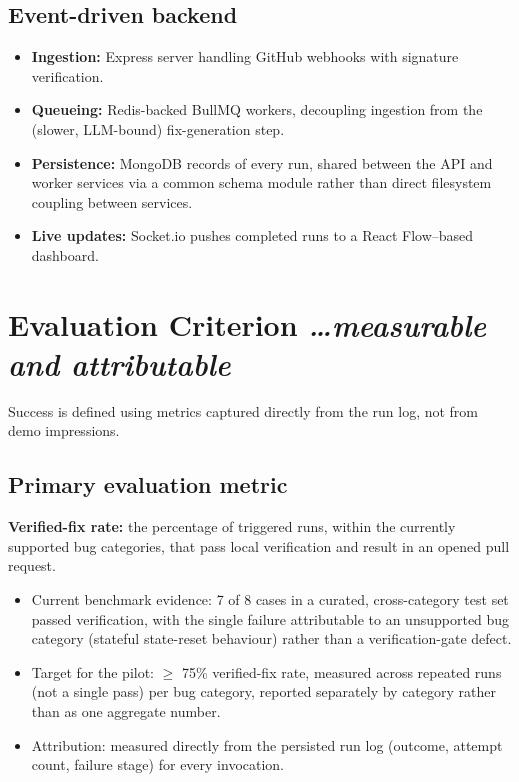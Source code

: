 \documentclass[11pt,a4paper]{article}
\newcommand{\BvrHint}[1]{%
  {\normalfont\normalsize\itshape\hfill #1}}
\begin{document}
\subsection{Event-driven backend}
\begin{itemize}[leftmargin=0.7cm]
    \item \textbf{Ingestion:} Express server handling GitHub
      webhooks with signature verification.
    \item \textbf{Queueing:} Redis-backed BullMQ workers, decoupling
      ingestion from the (slower, LLM-bound) fix-generation step.
    \item \textbf{Persistence:} MongoDB records of every run,
      shared between the API and worker services via a common
      schema module rather than direct filesystem coupling between
      services.
    \item \textbf{Live updates:} Socket.io pushes completed runs to
      a React Flow--based dashboard.
\end{itemize}

\section{Evaluation Criterion %
\BvrHint{\ldots measurable and attributable}}
Success is defined using metrics captured directly from the run log,
not from demo impressions.

\subsection{Primary evaluation metric}
\textbf{Verified-fix rate:} the percentage of triggered runs, within
the currently supported bug categories, that pass local verification
and result in an opened pull request.
\begin{itemize}[leftmargin=0.7cm]
    \item Current benchmark evidence: 7 of 8 cases in a curated,
      cross-category test set passed verification, with the single
      failure attributable to an unsupported bug category (stateful
      state-reset behaviour) rather than a verification-gate defect.
    \item Target for the pilot: $\ge$ 75\% verified-fix rate,
      measured across repeated runs (not a single pass) per bug
      category, reported separately by category rather than as one
      aggregate number.
    \item Attribution: measured directly from the persisted run log
      (outcome, attempt count, failure stage) for every invocation.
\end{itemize}
\end{document}
